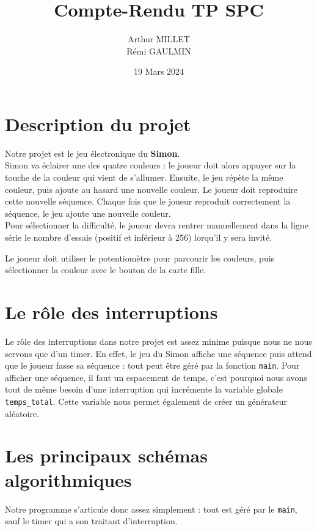 \documentclass[10pt,a4,french]{article}
\title{Compte-Rendu TP SPC}
\author{Arthur MILLET\\ Rémi GAULMIN}
\date{19 Mars 2024}
\begin{document}
\maketitle

\section{Description du projet}

Notre projet est le jeu électronique du \textbf{Simon}.
\\

Simon va éclairer une des quatre couleurs :
le joueur doit alors appuyer sur la touche de la couleur qui vient de s'allumer.
Ensuite, le jeu répète la même couleur, puis ajoute au hasard une nouvelle couleur.
Le joueur doit reproduire cette nouvelle séquence.
Chaque fois que le joueur reproduit correctement la séquence, le jeu ajoute une nouvelle couleur.
\\

Pour sélectionner la difficulté, le joueur devra rentrer manuellement dans la ligne série le nombre d'essais (positif et inférieur à 256) lorqu'il y sera invité.

Le joueur doit utiliser le potentiomètre pour parcourir les couleurs,
puis sélectionner la couleur avec le bouton de la carte fille.

\section{Le rôle des interruptions}

Le rôle des interruptions dans notre projet est assez minime puisque nous ne nous servons que d'un timer.
En effet, le jeu du Simon affiche une séquence puis attend que le joueur fasse sa séquence : tout peut être géré par la fonction \texttt{main}.
Pour afficher une séquence, il faut un espacement de temps,
c'est pourquoi nous avons tout de même besoin d'une interruption qui incrémente la variable globale \texttt{temps\_total}.
Cette variable nous permet également de créer un générateur aléatoire.

\section{Les principaux schémas algorithmiques}

Notre programme s'articule donc assez simplement : tout est géré par le \texttt{main}, sauf le timer qui a son traitant d'interruption.
\end{document}
